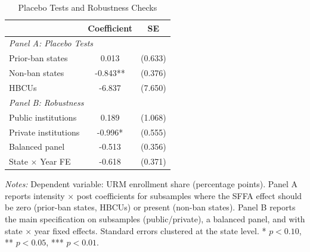 \begin{table}[htbp]
\centering
\caption{Placebo Tests and Robustness Checks}
\label{tab:robustness}
\begin{threeparttable}
\begin{tabular}{lcc}
\toprule
 & Coefficient & SE \\
\midrule
\multicolumn{3}{l}{\textit{Panel A: Placebo Tests}} \\
\quad Prior-ban states & 0.013 & (0.633) \\
\quad Non-ban states & -0.843** & (0.376) \\
\quad HBCUs & -6.837 & (7.650) \\
\midrule
\multicolumn{3}{l}{\textit{Panel B: Robustness}} \\
\quad Public institutions & 0.189 & (1.068) \\
\quad Private institutions & -0.996* & (0.555) \\
\quad Balanced panel & -0.513 & (0.356) \\
\quad State $\times$ Year FE & -0.618 & (0.371) \\
\bottomrule
\end{tabular}
\begin{tablenotes}[flushleft]\small
\item \textit{Notes:} Dependent variable: URM enrollment share (percentage points). Panel A reports intensity $\times$ post coefficients for subsamples where the SFFA effect should be zero (prior-ban states, HBCUs) or present (non-ban states). Panel B reports the main specification on subsamples (public/private), a balanced panel, and with state $\times$ year fixed effects. Standard errors clustered at the state level. * $p < 0.10$, ** $p < 0.05$, *** $p < 0.01$.
\end{tablenotes}
\end{threeparttable}
\end{table}
